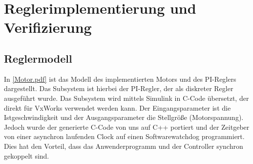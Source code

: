 \documentclass[./\jobname.tex]{subfiles}
\begin{document}
%
%
\chapter{Reglerimplementierung und Verifizierung}
%
\section{Reglermodell}
%
In \autoref{Motor.pdf} ist das Modell des implementierten Motors und des PI-Reglers dargestellt. Das Subsystem ist hierbei der PI-Regler, der als diskreter Regler ausgeführt wurde. Das Subsystem wird mittels Simulink in C-Code übersetzt, der direkt für VxWorks verwendet werden kann. Der Eingangsparameter ist die Istgeschwindigkeit und der Ausgangsparameter die Stellgröße (Motorspannung). Jedoch wurde der generierte C-Code von uns auf C++ portiert und der Zeitgeber von einer asynchron laufenden Clock auf einen Softwarewatchdog programmiert. Dies hat den Vorteil, dass das Anwenderprogramm und der Controller synchron gekoppelt sind.
%
\begin{figure}[H]
	\centering
	\noindent{}
	\label{Motor.pdf}
\end{figure}
\end{document}
